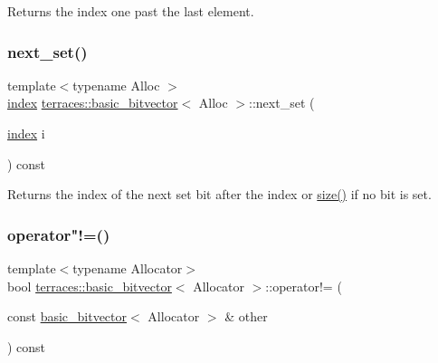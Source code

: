 Returns the index one past the last element. \mbox{\label{classterraces_1_1basic__bitvector_a21edd3eed32e2c09950d137987457078}} 
\subsubsection{\texorpdfstring{next\+\_\+set()}{next\_set()}}
{\footnotesize\ttfamily template$<$typename Alloc $>$ \\
\hyperlink{namespaceterraces_adbc33ccb543d1634e96d0eb02e472c77}{index} \hyperlink{classterraces_1_1basic__bitvector}{terraces\+::basic\+\_\+bitvector}$<$ Alloc $>$\+::next\+\_\+set (\begin{DoxyParamCaption}\item[{\hyperlink{namespaceterraces_adbc33ccb543d1634e96d0eb02e472c77}{index}}]{i }\end{DoxyParamCaption}) const}

Returns the index of the next set bit after the index or \hyperlink{classterraces_1_1basic__bitvector_a7a846347ea4c1c1f542ff3331307fdb9}{size()} if no bit is set. \mbox{\label{classterraces_1_1basic__bitvector_a6821bf429f6a9b60065c6e61faadb333}} 
\subsubsection{\texorpdfstring{operator"!=()}{operator!=()}}
{\footnotesize\ttfamily template$<$typename Allocator$>$ \\
bool \hyperlink{classterraces_1_1basic__bitvector}{terraces\+::basic\+\_\+bitvector}$<$ Allocator $>$\+::operator!= (\begin{DoxyParamCaption}\item[{const \hyperlink{classterraces_1_1basic__bitvector}{basic\+\_\+bitvector}$<$ Allocator $>$ \&}]{other }\end{DoxyParamCaption}) const\hspace{0.3cm}{\ttfamily [inline]}}

\mbox{\label{classterraces_1_1basic__bitvector_ac09540b4ecb00339e8a9b6a44e1711e3}} 
